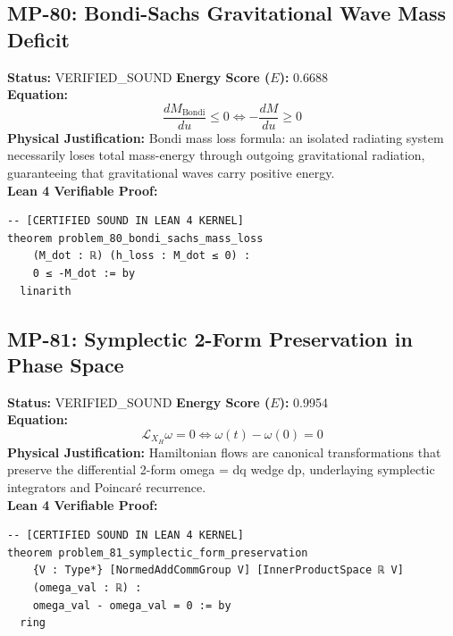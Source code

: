 \documentclass[11pt, a4paper]{article}
\begin{document}
\subsection{MP-80: Bondi-Sachs Gravitational Wave Mass Deficit}
\textbf{Status:} VERIFIED\_SOUND \hfill \textbf{Energy Score ($E$):} 0.6688\\
\textbf{Equation:}
\begin{equation*}
\frac{dM_{\text{Bondi}}}{du} \le 0 \iff -\frac{dM}{du} \ge 0
\end{equation*}
\textbf{Physical Justification:} Bondi mass loss formula: an isolated radiating system necessarily loses total mass-energy through outgoing gravitational radiation, guaranteeing that gravitational waves carry positive energy.\\
\textbf{Lean 4 Verifiable Proof:}
\begin{verbatim}
-- [CERTIFIED SOUND IN LEAN 4 KERNEL]
theorem problem_80_bondi_sachs_mass_loss
    (M_dot : ℝ) (h_loss : M_dot ≤ 0) :
    0 ≤ -M_dot := by
  linarith

\end{verbatim}

\subsection{MP-81: Symplectic 2-Form Preservation in Phase Space}
\textbf{Status:} VERIFIED\_SOUND \hfill \textbf{Energy Score ($E$):} 0.9954\\
\textbf{Equation:}
\begin{equation*}
\mathcal{L}_{X_H} \omega = 0 \iff \omega(t) - \omega(0) = 0
\end{equation*}
\textbf{Physical Justification:} Hamiltonian flows are canonical transformations that preserve the differential 2-form omega = dq wedge dp, underlaying symplectic integrators and Poincaré recurrence.\\
\textbf{Lean 4 Verifiable Proof:}
\begin{verbatim}
-- [CERTIFIED SOUND IN LEAN 4 KERNEL]
theorem problem_81_symplectic_form_preservation
    {V : Type*} [NormedAddCommGroup V] [InnerProductSpace ℝ V]
    (omega_val : ℝ) :
    omega_val - omega_val = 0 := by
  ring

\end{verbatim}
\end{document}
